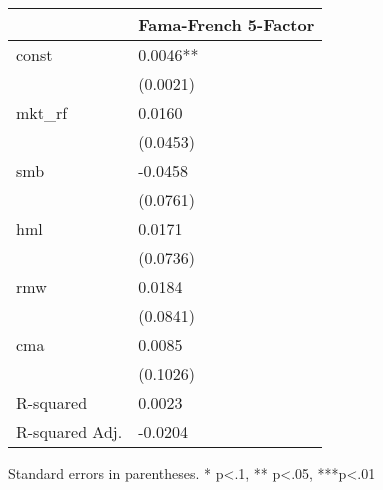 \begin{table}
\caption{}
\label{}
\begin{center}
\begin{tabular}{ll}
\hline
               & Fama-French 5-Factor  \\
\hline
const          & 0.0046**              \\
               & (0.0021)              \\
mkt\_rf        & 0.0160                \\
               & (0.0453)              \\
smb            & -0.0458               \\
               & (0.0761)              \\
hml            & 0.0171                \\
               & (0.0736)              \\
rmw            & 0.0184                \\
               & (0.0841)              \\
cma            & 0.0085                \\
               & (0.1026)              \\
R-squared      & 0.0023                \\
R-squared Adj. & -0.0204               \\
\hline
\end{tabular}
\end{center}
\end{table}
\bigskip
Standard errors in parentheses. \newline 
* p<.1, ** p<.05, ***p<.01
